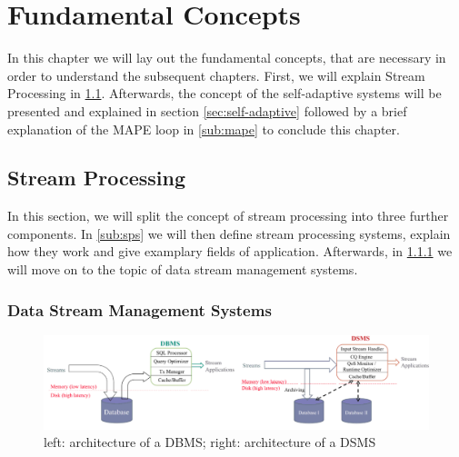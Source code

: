 \chapter{Fundamental Concepts}
\label{cha:fundamentals}
In this chapter we will lay out the fundamental concepts, that are necessary in order to understand the subsequent chapters.
First, we will explain Stream Processing in \ref{sec:stream-processing}. Afterwards, the concept of the self-adaptive systems will be presented and explained in section \ref{sec:self-adaptive} 
followed by a brief explanation of the MAPE loop in \ref{sub:mape} to conclude this chapter.

    \section{Stream Processing}
    \label{sec:stream-processing}
    In this section, we will split the concept of stream processing into three further components.
    In \ref{sub:sps} we will then define stream processing systems, explain how they work and give examplary fields of application.
    Afterwards, in \ref{sub:dsms} we will move on to the topic of data stream management systems.
    
        \subsection{Data Stream Management Systems}
        \label{sub:dsms}

        \begin{figure}[h]
            
            \centering
            \includegraphics[width=1.0\textwidth]{Bilder/dbms_dsms.png}
            \caption{
                   left: architecture of a DBMS; right: architecture of a DSMS
            }
            \label{fig:dbms_dsms}
        \end{figure}

